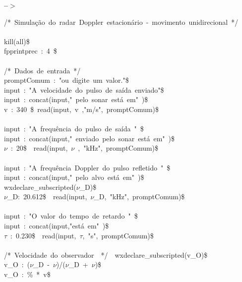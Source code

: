\documentclass[fleqn]{article}
\begin{document}
\noindent
\begin{minipage}[t]{4.000000em}\color{red}\bfseries
 --\ensuremath{\ensuremath{>}}	
\end{minipage}
\begin{minipage}[t]{\textwidth}\color{blue}
/*\ Simulação\ do\ radar\ Doppler\ estacionário\ -\ movimento\ unidirecional\ */\\
\\
kill(all)\$\ \\
fpprintprec\ :\ 4\ \$\\
\\
/*\ Dados\ de\ entrada\ */\\
promptComum\ :\ "ou\ digite\ um\ valor."\$\\
input\ :\ "A\ velocidade\ do\ pulso\ de\ saída\ enviado"\$\\
input\ :\ concat(input,"\ pelo\ sonar\ está\ em"\ )\$\\
v\ :\ 340\ \$\ read(input,\ v\ ,"m/s",\ promptComum)\$\\
\\
input\ :\ "A\ frequência\ do\ pulso\ de\ saída\ "\ \$\\
input\ :\ concat(input,"\ enviado\ pelo\ sonar\ está\ em"\ )\$\\
\ensuremath{\nu}\ :\ 20\$\ \ read(input,\ \ensuremath{\nu}\ ,\ "kHz",\ promptComum)\$\\
\\
input\ :\ "A\ frequência\ Doppler\ do\ pulso\ refletido\ "\ \$\\
input\ :\ concat(input,"\ pelo\ alvo\ está\ em"\ )\$\\
wxdeclare\_subscripted(\ensuremath{\nu}\_D)\$\ \\
\ensuremath{\nu}\_D:\ 20.612\$\ \ read(input,\ \ensuremath{\nu}\_D,\ "kHz",\ promptComum)\$\\
\\
input\ :\ "O\ valor\ do\ tempo\ de\ retardo\ "\ \$\\
input\ :\ concat(input,"está\ em"\ )\$\\
\ensuremath{\tau}\ :\ 0.230\$\ \ read(input,\ \ensuremath{\tau},\ "s",\ promptComum)\$\\
\ \ \\
/*\ Velocidade\ do\ observador\ \ */\ \ wxdeclare\_subscripted(v\_O)\$\\
v\_O\ :\ (\ensuremath{\nu}\_D\ -\ \ensuremath{\nu})/(\ensuremath{\nu}\_D\ +\ \ensuremath{\nu})\$\\
v\_O\ :\ \%\ *\ v\$\\

\end{minipage}
\end{document}
